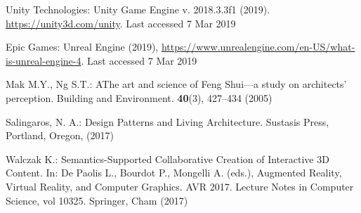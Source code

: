 \documentclass[runningheads]{llncs}
\begin{document}
\begin{thebibliography}{8}
Unity Technologies: Unity Game Engine v. 2018.3.3f1 (2019). \url{https://unity3d.com/unity}. Last accessed 7 Mar 2019

Epic Games: Unreal Engine (2019), \url{https://www.unrealengine.com/en-US/what-is-unreal-engine-4}. Last accessed 7 Mar 2019

Mak M.Y., Ng S.T.: AThe art and science of Feng Shui—a study on architects’ perception. Building and Environment. \textbf{40}(3), 427--434 (2005)

Salingaros, N. A.: Design Patterns and Living Architecture. Sustasis Press, Portland, Oregon, (2017) 

Walczak K.: Semantics-Supported Collaborative Creation of Interactive 3D Content. In: De Paolis L., Bourdot P., Mongelli A. (eds.), Augmented Reality, Virtual Reality, and Computer Graphics. AVR 2017. Lecture Notes in Computer Science, vol 10325. Springer, Cham (2017)
\end{thebibliography}
\end{document}

